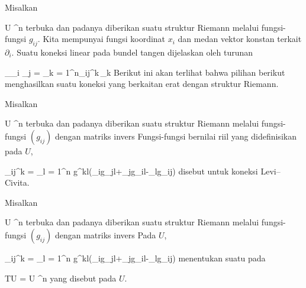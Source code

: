 \setcounter{section}{26}


Misalkan

\mavergleichskette
{\vergleichskette
{ U
}
{ \subseteq }{ \R^n
}
{  }{
}
{    }{
}
{   }{
}
}
{}{}{}
terbuka dan padanya diberikan suatu struktur Riemann melalui fungsi-fungsi $g_{ij}$. Kita mempunyai fungsi koordinat $x_i$ dan medan vektor konstan terkait $\partial_i$. Suatu koneksi linear pada bundel tangen
 dijelaskan oleh turunan

\mavergleichskettedisp
{\vergleichskette
{ \nabla_{\partial_i } \partial_j
}
{ =} { \sum_{k = 1}^n\Gamma_{ij}^k\,\partial_k
}
{ } {
}
{ } {
}
{ } {
}
}
{}{}{}
Berikut ini akan terlihat bahwa pilihan berikut menghasilkan suatu koneksi yang berkaitan erat dengan struktur Riemann.

{}
{

Misalkan

\mavergleichskette
{\vergleichskette
{ U
}
{ \subseteq }{ \R^n
}
{  }{
}
{    }{
}
{   }{
}
}
{}{}{}
terbuka dan padanya diberikan suatu struktur Riemann melalui fungsi-fungsi $\left(  g_{ij}  \right)$ dengan matriks invers
 Fungsi-fungsi bernilai riil yang didefinisikan pada $U$,

\mavergleichskettedisp
{\vergleichskette
{ \Gamma_{ij}^k
}
{ =} { {  } \sum_{l = 1}^n g^{kl}(\partial_ig_{jl}+\partial_jg_{il}-\partial_lg_{ij})
}
{ } {
}
{ } {
}
{ } {
}
}
{}{}{}
disebut
untuk koneksi Levi--Civita.

}

{}
{

Misalkan

\mavergleichskette
{\vergleichskette
{ U
}
{ \subseteq }{ \R^n
}
{  }{
}
{    }{
}
{   }{
}
}
{}{}{}
terbuka dan padanya diberikan suatu struktur Riemann melalui fungsi-fungsi $\left(  g_{ij}  \right)$ dengan matriks invers
 Pada $U$,

\mavergleichskettedisp
{\vergleichskette
{ \Gamma_{ij}^k
}
{ =} { {  } \sum_{l = 1}^n g^{kl}(\partial_ig_{jl}+\partial_jg_{il}-\partial_lg_{ij})
}
{ } {
}
{ } {
}
{ } {
}
}
{}{}{}
menentukan suatu
pada

\mavergleichskette
{\vergleichskette
{ TU
}
{ = }{ U \times \R^n
}
{  }{
}
{    }{
}
{   }{
}
}
{}{}{}
yang disebut
pada $U$.

}



